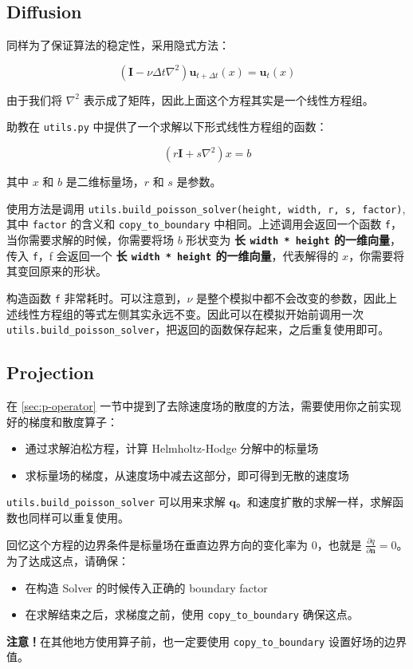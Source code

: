 \documentclass{ctexart}
\begin{document}
\subsection{Diffusion}

同样为了保证算法的稳定性，采用隐式方法：

\begin{equation}
(\textbf{I} - \nu \Delta t \nabla^2) \mathbf{u}_{t+\Delta t}(x) = \mathbf{u}_t (x)
\end{equation}

由于我们将 $\nabla ^ 2$ 表示成了矩阵，因此上面这个方程其实是一个线性方程组。

助教在 \texttt{utils.py} 中提供了一个求解以下形式线性方程组的函数：

\begin{equation}
(r \textbf{I} + s \nabla^2) x = b
\end{equation}

其中 $x$ 和 $b$ 是二维标量场，$r$ 和 $s$ 是参数。

使用方法是调用 \texttt{utils.build\_poisson\_solver(height, width, r, s, factor)}, 其中 \texttt{factor} 的含义和 \texttt{copy\_to\_boundary} 中相同。上述调用会返回一个函数 \texttt{f}，当你需要求解的时候，你需要将场 $b$ 形状变为 \textbf{长 \texttt{width * height} 的一维向量}，传入 \texttt{f}，f 会返回一个 \textbf{长 \texttt{width * height} 的一维向量}，代表解得的 $x$，你需要将其变回原来的形状。

构造函数 \texttt{f} 非常耗时。可以注意到，$\nu$ 是整个模拟中都不会改变的参数，因此上述线性方程组的等式左侧其实永远不变。因此可以在模拟开始前调用一次 \texttt{utils.build\_poisson\_solver}，把返回的函数保存起来，之后重复使用即可。

\subsection{Projection}
在 \ref{sec:p-operator} 一节中提到了去除速度场的散度的方法，需要使用你之前实现好的梯度和散度算子：

\begin{itemize}
  \item 通过求解泊松方程，计算 Helmholtz-Hodge 分解中的标量场
  \item 求标量场的梯度，从速度场中减去这部分，即可得到无散的速度场
\end{itemize}

\texttt{utils.build\_poisson\_solver} 可以用来求解 $\mathbf{q}$。和速度扩散的求解一样，求解函数也同样可以重复使用。

回忆这个方程的边界条件是标量场在垂直边界方向的变化率为 0，也就是 $\frac{\partial q}{\partial \mathbf{n}} = 0$。为了达成这点，请确保：

\begin{itemize}
  \item 在构造 Solver 的时候传入正确的 boundary factor
  \item 在求解结束之后，求梯度之前，使用 \texttt{copy\_to\_boundary} 确保这点。
\end{itemize}

\textbf{注意！}在其他地方使用算子前，也一定要使用 \texttt{copy\_to\_boundary} 设置好场的边界值。
\end{document}
